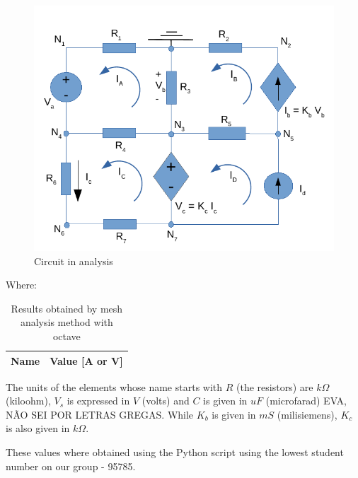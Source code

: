 \begin{figure}[H] \centering
\includegraphics[width=1\linewidth]{circuito.pdf}
\caption{Circuit in analysis}
\label{fig:circuito}
\end{figure}

Where:
\begin{center}
\begin{table}[H]
 \centering
  \begin{tabular}{|c|c|}
    \hline    
    {\bf Name} & {\bf Value [A or V]} \\ \hline
    
  \end{tabular}
  \caption{Results obtained by mesh analysis method with octave}
  \label{tab:mesh}
\end{table}
\end{center}

The units of the elements whose name starts with $R$ (the resistors) are $k\Omega$ (kiloohm), $V_s$ is expressed in $V$ (volts) and $C$ is given in $uF$ (microfarad) EVA, NÃO SEI POR LETRAS GREGAS. While $K_b$ is given in $mS$ (milisiemens), $K_c$ is also given in $k\Omega$.

These values where obtained using the Python script using the lowest student number on our group - 95785.


